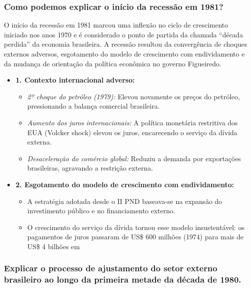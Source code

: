 \documentclass[a4paper,12pt]{article}[abntex2]
\begin{document}
\subsubsection{\textbf{Como podemos explicar o início da recessão em 1981?}}

O início da recessão em 1981 marcou uma inflexão no ciclo de crescimento iniciado nos anos 1970 e é considerado o ponto de partida da chamada “década perdida” da economia brasileira. A recessão resultou da convergência de choques externos adversos, esgotamento do modelo de crescimento com endividamento e da mudança de orientação da política econômica no governo Figueiredo.

\begin{itemize}
    \item \textbf{1. Contexto internacional adverso:}
    \begin{itemize}
        \item \textit{2º choque do petróleo (1979):} Elevou novamente os preços do petróleo, pressionando a balança comercial brasileira.
        \item \textit{Aumento dos juros internacionais:} A política monetária restritiva dos EUA (Volcker shock) elevou os juros, encarecendo o serviço da dívida externa.
        \item \textit{Desaceleração do comércio global:} Reduziu a demanda por exportações brasileiras, agravando a restrição externa.
    \end{itemize}

    \item \textbf{2. Esgotamento do modelo de crescimento com endividamento:}
    \begin{itemize}
        \item A estratégia adotada desde o II PND baseava-se na expansão do investimento público e no financiamento externo.
        \item O crescimento do serviço da dívida tornou esse modelo insustentável: os pagamentos de juros passaram de US\$ 600 milhões (1974) para mais de US\$ 4 bilhões em
    \end{itemize}
\end{itemize}

\subsubsection{\textbf{Explicar o processo de ajustamento do setor externo brasileiro ao longo da primeira metade da década de 1980.}}
\end{document}
